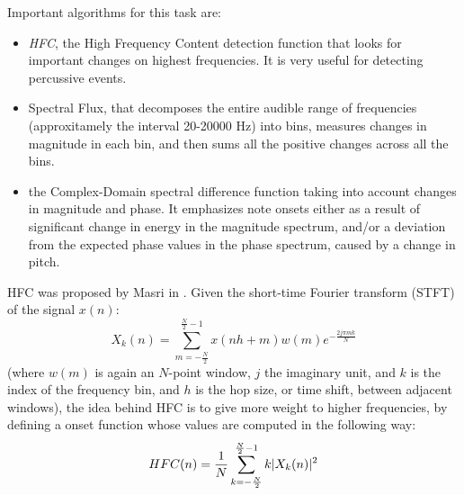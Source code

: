 Important algorithms for this task are:
\begin{itemize}
\item \textit{HFC}, the High Frequency Content detection function that looks for important changes on highest frequencies. It is very useful for detecting percussive events.
\item Spectral Flux, that decomposes the entire audible range of frequencies (approxitamely the interval 20-20000 Hz) into bins, measures changes in magnitude in each bin, and then sums all the positive changes across all the bins.
\item the Complex-Domain spectral difference function \cite{bello04} taking into account changes in magnitude and phase. It emphasizes note onsets either as a result of significant change in energy in the magnitude spectrum, and/or a deviation from the expected phase values in the phase spectrum, caused by a change in pitch.
\end{itemize}  
HFC was proposed by Masri in \cite{masri96}. Given the short-time Fourier transform (STFT) of the signal $x(n)$:\\
\begin{equation}
X_k(n) = \sum\limits_{m=-\frac{N}{2}}^{\frac{N}{2}-1} x(nh + m)w(m)e^{-\frac{2j\pi mk}{N}}
\end{equation}
(where $w(m)$ is again an $N$-point window, $j$ the imaginary unit, and $k$ is the index of the frequency bin, and $h$ is the hop size, or time shift, between adjacent windows), the idea behind HFC is to give more weight to higher frequencies, by defining a onset function whose values are computed in the following way:
\begin{equation}
HFC(n) = \frac{1}{N}\sum\limits_{k=-\frac{N}{2}}^{\frac{N}{2}-1} k\lvert X_k(n)\rvert^{2}
\end{equation}

